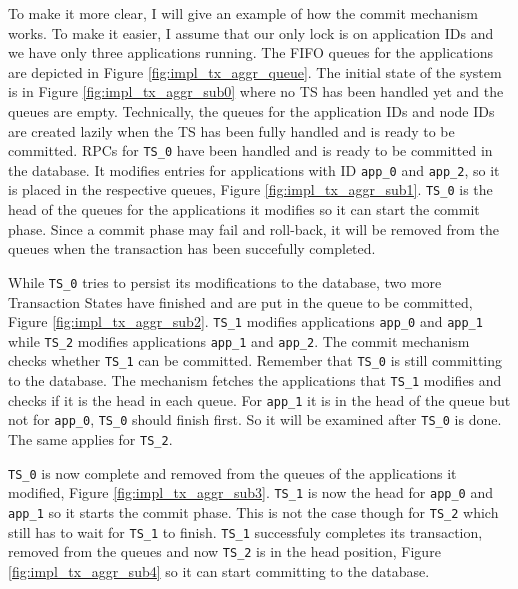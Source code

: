 To make it more clear, I will give an example of how the commit mechanism
works. To make it easier, I assume that our only lock is on
application IDs and we have only three applications running. The FIFO
queues for the applications are depicted in Figure
\ref{fig:impl_tx_aggr_queue}. The initial state of the system is in
Figure \ref{fig:impl_tx_aggr_sub0} where no TS has been handled yet
and the queues are empty. Technically, the queues for the application
IDs and node IDs are created lazily when the TS has been fully handled
and is ready to be committed. RPCs for \texttt{TS\_0} have been
handled and is ready to be committed in the database. It modifies
entries for applications with ID \texttt{app\_0} and \texttt{app\_2},
so it is placed in the respective queues, Figure
\ref{fig:impl_tx_aggr_sub1}. \texttt{TS\_0} is the head
of the queues for the applications it modifies so it can start the
commit phase. Since a commit phase may fail and roll-back, it will be
removed from the queues when the transaction has been succefully
completed.

While \texttt{TS\_0} tries to persist its modifications to the
database, two more Transaction States have finished and are put in the
queue to be committed, Figure
\ref{fig:impl_tx_aggr_sub2}. \texttt{TS\_1} modifies applications
\texttt{app\_0} and \texttt{app\_1} while \texttt{TS\_2} modifies
applications \texttt{app\_1} and \texttt{app\_2}. The commit mechanism
checks whether \texttt{TS\_1} can be committed. Remember that
\texttt{TS\_0} is still committing to the database. The mechanism
fetches the applications that \texttt{TS\_1} modifies and checks if it
is the head in each queue. For \texttt{app\_1} it is in the head of
the queue but not for \texttt{app\_0}, \texttt{TS\_0} should finish
first. So it will be examined after \texttt{TS\_0} is done. The same
applies for \texttt{TS\_2}.

\texttt{TS\_0} is now complete and removed from the queues of the
applications it modified, Figure
\ref{fig:impl_tx_aggr_sub3}. \texttt{TS\_1} is now the head for
\texttt{app\_0} and \texttt{app\_1} so it starts the commit
phase. This is not the case though for \texttt{TS\_2} which still has
to wait for \texttt{TS\_1} to finish. \texttt{TS\_1} successfuly
completes its transaction, removed from the queues and now
\texttt{TS\_2} is in the head position, Figure
\ref{fig:impl_tx_aggr_sub4} so it can start committing to the database.

